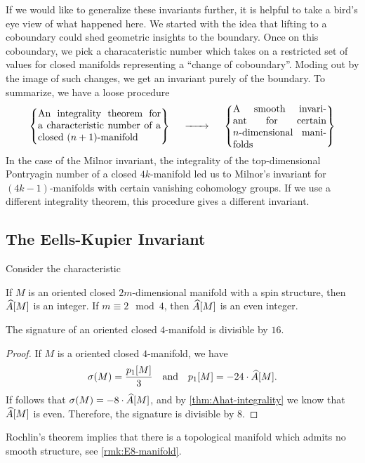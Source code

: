 If we would like to generalize these invariants further, it is helpful to take a bird's eye view of what happened here. We started with the idea that lifting to a coboundary could shed geometric insights to the boundary. Once on this coboundary, we pick a characateristic number which takes on a restricted set of values for closed manifolds representing a ``change of coboundary''. Moding out by the image of such changes, we get an invariant purely of the boundary. To summarize, we have a loose procedure
\[
	\left\{\parbox{12.5em}{An integrality theorem for a characteristic number of a closed $(n+1)$-manifold}\right\}
	\quad\lkxto\quad
	\left\{\parbox{9.5em}{A smooth invariant for certain $n$-dimensional manifolds}\right\}
\]
In the case of the Milnor invariant, the integrality of the top-dimensional Pontryagin number of a closed $4k$-manifold led us to Milnor's invariant for $(4k-1)$-manifolds with certain vanishing cohomology groups.
If we use a different integrality theorem, this procedure gives a different invariant.

\subsection{The Eells-Kupier Invariant}\label{sec:eells-kupier-invariant}

Consider the characteristic

\begin{theorem}\label{thm:Ahat-integrality}
	If $M$ is an oriented closed $2m$-dimensional manifold with a spin structure, then $\widehat{A}[M]$ is an integer. If $m\equiv 2\mod 4$, then $\widehat{A}[M]$ is an even integer.
\end{theorem}

\begin{theorem}[Rochlin]\label{thm:rochlin}
	The signature of an oriented closed $4$-manifold is divisible by $16$.
\end{theorem}
\begin{proof}
	If $M$ is a oriented closed $4$-manifold, we have
	\[
		\sigma(M) = \frac{p_1[M]}{3}\quad\textrm{and}\quad p_1[M] = -24\cdot\widehat{A}[M].
	\]
	If follows that $\sigma(M)=-8\cdot\widehat{A}[M]$, and by \cref{thm:Ahat-integrality} we know that $\widehat{A}[M]$ is even. Therefore, the signature is divisible by $8$.
\end{proof}

\begin{remark}
	Rochlin's theorem implies that there is a topological manifold which admits no smooth structure, see \cref{rmk:E8-manifold}.
\end{remark}

